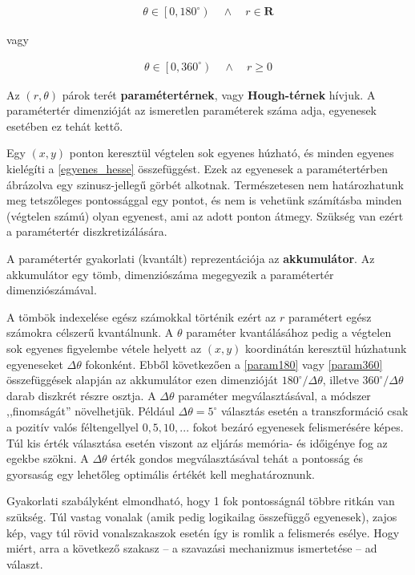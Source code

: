 \begin{align}\label{eq:param180}
\theta \in \left[ 0,180^{\circ} \right) \quad \wedge \quad r \in \mathbf{R}
\end{align}

vagy

\begin{align}\label{eq:param360}
\theta \in \left[ 0,360^{\circ} \right) \quad \wedge \quad r \geq 0
\end{align}

Az $ (r, \theta) $ párok terét \textbf{paramétertérnek}, vagy \textbf{Hough-térnek} hívjuk. A paramétertér dimenzióját az ismeretlen paraméterek száma adja, egyenesek esetében ez tehát kettő.

Egy $ (x,y) $ ponton keresztül végtelen sok egyenes húzható, és minden egyenes kielégíti a \eqref{egyenes_hesse} összefüggést. Ezek az egyenesek a paramétertérben ábrázolva egy szinusz-jellegű görbét alkotnak. Természetesen nem határozhatunk meg tetszőleges pontossággal egy pontot, és nem is vehetünk számításba minden (végtelen számú) olyan egyenest, ami az adott ponton átmegy. Szükség van ezért a paramétertér diszkretizálására.

\bigskip

A paramétertér gyakorlati (kvantált) reprezentációja az \textbf{akkumulátor}. Az akkumulátor egy tömb, dimenziószáma megegyezik a paramétertér dimenziószámával.

A tömbök indexelése egész számokkal történik ezért az $ r $ paramétert egész számokra célszerű kvantálnunk. A $ \theta $ paraméter kvantálásához pedig a végtelen sok egyenes figyelembe vétele helyett az $ (x,y) $ koordinátán keresztül húzhatunk egyeneseket $ \varDelta \theta $ fokonként. Ebből következően a \eqref{param180} vagy \eqref{param360} összefüggések alapján az akkumulátor ezen dimenzióját $ 180^{\circ} / \varDelta \theta $, illetve $ 360^{\circ} / \varDelta \theta $ darab diszkrét részre osztja. A $ \varDelta \theta $ paraméter megválasztásával, a módszer ,,finomságát'' növelhetjük. Például $ \varDelta \theta = 5^{\circ} $ választás esetén a transzformáció csak a pozitív valós féltengellyel $ 0, 5, 10, ... $ fokot bezáró egyenesek felismerésére képes. Túl kis érték választása esetén viszont az eljárás memória- és időigénye fog az egekbe szökni. A $ \varDelta \theta $ érték gondos megválasztásával tehát a pontosság és gyorsaság egy lehetőleg optimális értékét kell meghatároznunk.

Gyakorlati szabályként elmondható, hogy 1 fok pontosságnál többre ritkán van szükség. Túl vastag vonalak (amik pedig logikailag összefüggő egyenesek), zajos kép, vagy túl rövid vonalszakaszok esetén így is romlik a felismerés esélye. Hogy miért, arra a következő szakasz -- a szavazási mechanizmus ismertetése -- ad választ.

